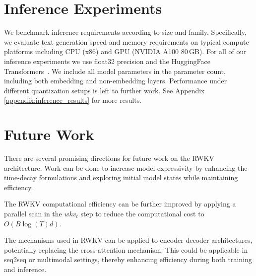 \section{Inference Experiments} \label{infer_experiments}

We benchmark inference requirements according to size and family. Specifically, we evaluate text generation speed and memory requirements on typical compute platforms including CPU (x86) and GPU (NVIDIA A100 80\,GB). For all of our inference experiments we use float32 precision and the HuggingFace Transformers~\cite{hf_transformers}. We include all model parameters in the parameter count, including both embedding and non-embedding layers. Performance under different quantization setups is left to further work. See Appendix \ref{appendix:inference_results} for more results.

\section{Future Work} \label{future_work}

There are several promising directions for future work on the RWKV architecture. Work can be done to increase model expressivity by enhancing the time-decay formulations and exploring initial model states while maintaining efficiency.

The RWKV computational efficiency can be further improved by applying a parallel scan in the $wkv_t$ step to reduce the computational cost to $O(B\log(T)d)$.

The mechanisms used in RWKV can be applied to encoder-decoder architectures, potentially replacing the cross-attention mechanism. This could be applicable in seq2seq or multimodal settings, thereby enhancing efficiency during both training and inference. 

